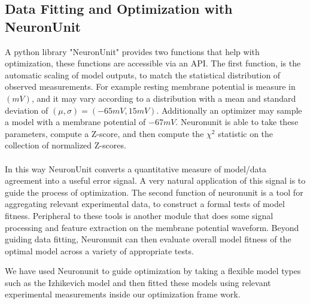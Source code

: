 \subsection{Data Fitting and Optimization with NeuronUnit}
A python library "NeuronUnit" provides two functions that help with optimization, these functions are accessible via an API. The first function, is the automatic scaling of model outputs, to match the statistical distribution of observed measurements. For example resting membrane potential is measure in $(mV)$, and it may vary according to a distribution with a mean and standard deviation of $(\mu,\sigma)=(-65mV,15mV)$. Additionally an optimizer may sample a model with a membrane potential of $-67mV$. Neuronunit is able to take these parameters, compute a Z-score, and then compute the $\chi^{2}$
statistic on the collection of normalized Z-scores.\\
\\
In this way NeuronUnit converts a quantitative measure of model/data agreement into a useful error signal. A very natural application of this signal is to guide the process of optimization. The second function of neuronunit is a tool for aggregating relevant experimental data, to construct a formal tests of model fitness. Peripheral to these tools is another module that does some signal processing and feature extraction on the membrane potential waveform. Beyond guiding data fitting, Neuronunit can then evaluate overall model fitness of the optimal model across a variety of appropriate tests.


We have used Neuronunit to guide optimization by taking a flexible model types such as the Izhikevich model and then fitted these models using relevant experimental measurements inside our optimization frame work.

